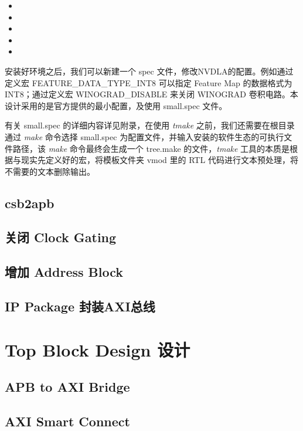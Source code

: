 \begin{itemize}
    \item 
    \item 
    \item 
    \item 
    \item 
\end{itemize}

安装好环境之后，我们可以新建一个 spec 文件，修改NVDLA的配置。例如通过定义宏 FEATURE\_DATA\_TYPE\_INT8 可以指定 Feature Map 的数据格式为 INT8；通过定义宏 WINOGRAD\_DISABLE 来关闭 WINOGRAD 卷积电路。本设计采用的是官方提供的最小配置，及使用 small.spec 文件。

有关 small.spec 的详细内容详见附录，在使用 \emph{tmake} 之前，我们还需要在根目录通过 \emph{make} 命令选择 small.spec 为配置文件，并输入安装的软件生态的可执行文件路径，该 \emph{make} 命令最终会生成一个 tree.make 的文件，\emph{tmake} 工具的本质是根据与现实先定义好的宏，将模板文件夹 vmod 里的 RTL 代码进行文本预处理，将不需要的文本删除输出。


\subsection{csb2apb}

\subsection{关闭 Clock Gating}

\subsection{增加 Address Block}

\subsection{IP Package 封装AXI总线}

\section{Top Block Design 设计}

\subsection{APB to AXI Bridge}

\subsection{AXI Smart Connect}

